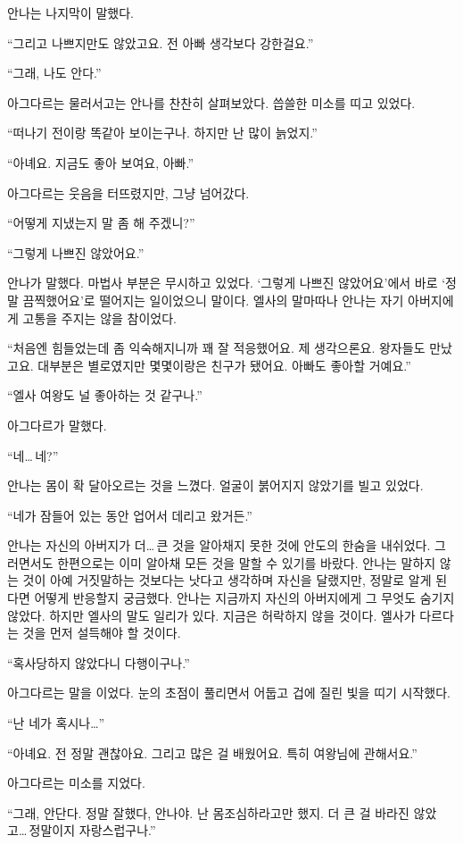 안나는 나지막이 말했다.

``그리고 나쁘지만도 않았고요. 전 아빠 생각보다 강한걸요.''

``그래, 나도 안다.''

아그다르는 물러서고는 안나를 찬찬히 살펴보았다. 씁쓸한 미소를 띠고 있었다.

``떠나기 전이랑 똑같아 보이는구나. 하지만 난 많이 늙었지.''

``아녜요. 지금도 좋아 보여요, 아빠.''

아그다르는 웃음을 터뜨렸지만, 그냥 넘어갔다.

``어떻게 지냈는지 말 좀 해 주겠니?''

``그렇게 나쁘진 않았어요.''

안나가 말했다. 마법사 부분은 무시하고 있었다. `그렇게 나쁘진 않았어요'에서 바로 `정말 끔찍했어요'로 떨어지는 일이었으니 말이다. 엘사의 말마따나 안나는 자기 아버지에게 고통을 주지는 않을 참이었다.

``처음엔 힘들었는데 좀 익숙해지니까 꽤 잘 적응했어요. 제 생각으론요. 왕자들도 만났고요. 대부분은 별로였지만 몇몇이랑은 친구가 됐어요. 아빠도 좋아할 거예요.''

``엘사 여왕도 널 좋아하는 것 같구나.''

아그다르가 말했다.

``네\ldots\,네?''

안나는 몸이 확 달아오르는 것을 느꼈다. 얼굴이 붉어지지 않았기를 빌고 있었다.

``네가 잠들어 있는 동안 업어서 데리고 왔거든.''

안나는 자신의 아버지가 더\ldots\,큰 것을 알아채지 못한 것에 안도의 한숨을 내쉬었다. 그러면서도 한편으로는 이미 알아채 모든 것을 말할 수 있기를 바랐다. 안나는 말하지 않는 것이 아예 거짓말하는 것보다는 낫다고 생각하며 자신을 달랬지만, 정말로 알게 된다면 어떻게 반응할지 궁금했다. 안나는 지금까지 자신의 아버지에게 그 무엇도 숨기지 않았다. 하지만 엘사의 말도 일리가 있다. 지금은 허락하지 않을 것이다. 엘사가 다르다는 것을 먼저 설득해야 할 것이다.

``혹사당하지 않았다니 다행이구나.''

아그다르는 말을 이었다. 눈의 초점이 풀리면서 어둡고 겁에 질린 빛을 띠기 시작했다.

``난 네가 혹시나\ldots''

``아녜요. 전 정말 괜찮아요. 그리고 많은 걸 배웠어요. 특히 여왕님에 관해서요.''

아그다르는 미소를 지었다.

``그래, 안단다. 정말 잘했다, 안나야. 난 몸조심하라고만 했지. 더 큰 걸 바라진 않았고\ldots\,정말이지 자랑스럽구나.''

